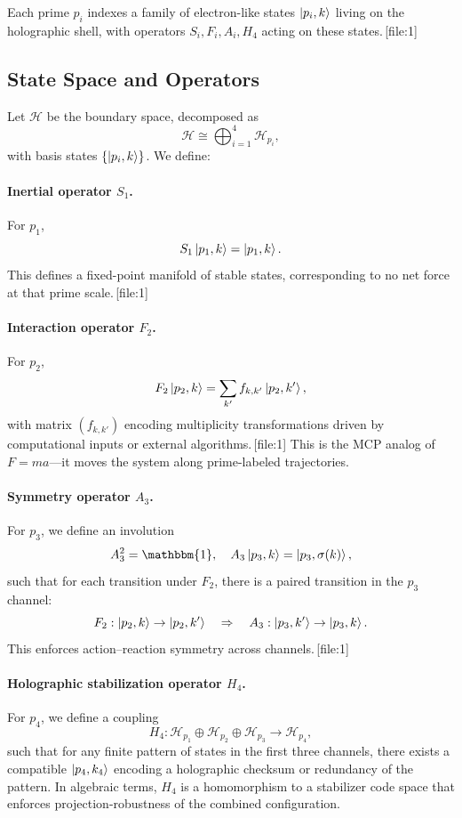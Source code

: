 \documentclass[11pt]{article}
\begin{document}
Each prime $p_i$ indexes a family of electron-like states
$\ket{p_i,k}$ living on the holographic shell, with operators
$S_i,F_i,A_i,H_4$ acting on these states.\,[file:1]

\subsection{State Space and Operators}

Let $\mathcal{H}$ be the boundary space, decomposed as
\[
  \mathcal{H} \cong \bigoplus_{i=1}^4 \mathcal{H}_{p_i},
\]
with basis states $\{\ket{p_i,k}\}$.
We define:

\paragraph{Inertial operator $S_1$.}
For $p_1$,
\[
  S_1 \ket{p_1,k} = \ket{p_1,k}.
\]
This defines a fixed-point manifold of stable states, corresponding to
no net force at that prime scale.\,[file:1]

\paragraph{Interaction operator $F_2$.}
For $p_2$,
\[
  F_2\ket{p_2,k} = \sum_{k'} f_{k,k'}\ket{p_2,k'},
\]
with matrix $(f_{k,k'})$ encoding multiplicity transformations driven by
computational inputs or external algorithms.\,[file:1]
This is the MCP analog of $F=ma$---it moves the system along prime-labeled
trajectories.

\paragraph{Symmetry operator $A_3$.}
For $p_3$, we define an involution
\[
  A_3^2 = \mathbbm{1}, \quad
  A_3\ket{p_3,k} = \ket{p_3,\sigma(k)},
\]
such that for each transition under $F_2$, there is a paired transition
in the $p_3$ channel:
\[
  F_2: \ket{p_2,k} \to \ket{p_2,k'} \quad\Rightarrow\quad
  A_3: \ket{p_3,k'} \to \ket{p_3,k}.
\]
This enforces action--reaction symmetry across channels.\,[file:1]

\paragraph{Holographic stabilization operator $H_4$.}
For $p_4$, we define a coupling
\[
  H_4: \mathcal{H}_{p_1}\oplus\mathcal{H}_{p_2}\oplus\mathcal{H}_{p_3}
  \to \mathcal{H}_{p_4},
\]
such that for any finite pattern of states in the first three channels,
there exists a compatible $\ket{p_4,k_4}$ encoding a holographic checksum
or redundancy of the pattern.
In algebraic terms, $H_4$ is a homomorphism to a stabilizer code space
that enforces projection-robustness of the combined configuration.
\end{document}
